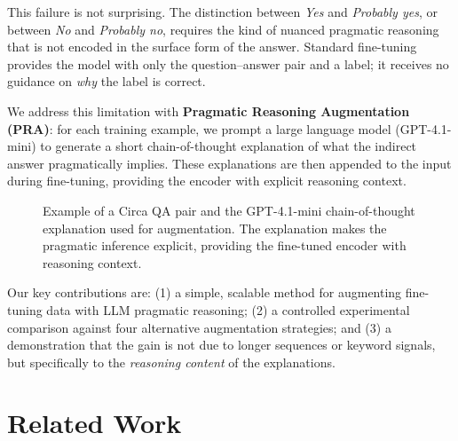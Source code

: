 \documentclass[11pt,a4paper]{article}
\begin{document}
This failure is not surprising. The distinction between \textit{Yes} and \textit{Probably yes}, or between \textit{No} and \textit{Probably no}, requires the kind of nuanced pragmatic reasoning that is not encoded in the surface form of the answer. Standard fine-tuning provides the model with only the question--answer pair and a label; it receives no guidance on \textit{why} the label is correct.

We address this limitation with \textbf{Pragmatic Reasoning Augmentation (PRA)}: for each training example, we prompt a large language model (GPT-4.1-mini) to generate a short chain-of-thought explanation of what the indirect answer pragmatically implies. These explanations are then appended to the input during fine-tuning, providing the encoder with explicit reasoning context.

\begin{figure}[t]
\centering
{}
\caption{Example of a Circa QA pair and the GPT-4.1-mini chain-of-thought explanation used for augmentation. The explanation makes the pragmatic inference explicit, providing the fine-tuned encoder with reasoning context.}
\label{fig:example}
\end{figure}

Our key contributions are: (1) a simple, scalable method for augmenting fine-tuning data with LLM pragmatic reasoning; (2) a controlled experimental comparison against four alternative augmentation strategies; and (3) a demonstration that the gain is not due to longer sequences or keyword signals, but specifically to the \textit{reasoning content} of the explanations.

\section{Related Work}
\end{document}
